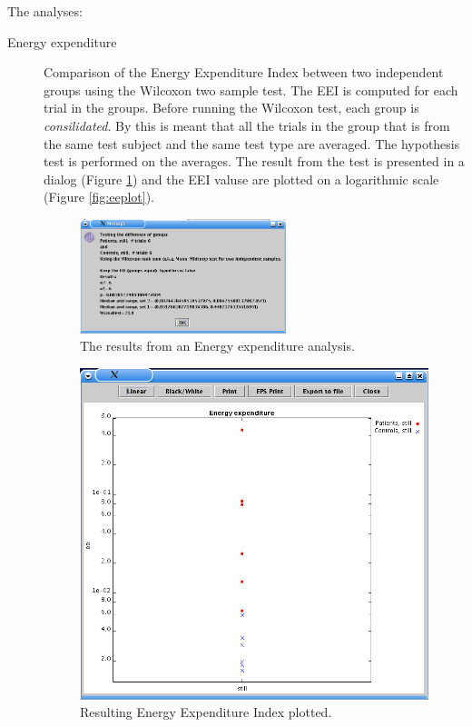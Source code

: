 \documentclass[a4paper,11pt]{article}
\begin{document}
The analyses:
\begin{description}
\item[Energy expenditure] Comparison of the Energy Expenditure Index
  between two independent groups 
  using the Wilcoxon two sample test. The EEI is computed for each
  trial in the groups. Before running the Wilcoxon test, each 
  group is \emph{consilidated}. By this is meant that all the trials in
  the group that is from the same test subject and the same test type
  are averaged. The hypothesis test is performed on the averages. 
  The result from the test is presented in a
  dialog (Figure \ref{fig:eeresult}) and the EEI valuse are plotted
  on a logarithmic scale (Figure \ref{fig:eeplot}).
  \begin{figure}[htbp]
    \centering
    \includegraphics[width=60mm]{figures/eeresults.png}
    \caption{The results from an Energy expenditure analysis.}
    \label{fig:eeresult}
  \end{figure}
  \begin{figure}[htbp]
    \centering
    \includegraphics[width=120mm]{figures/eeplot.png}
    \caption{Resulting Energy Expenditure Index plotted.}

\end{figure}
\end{description}
\end{document}
